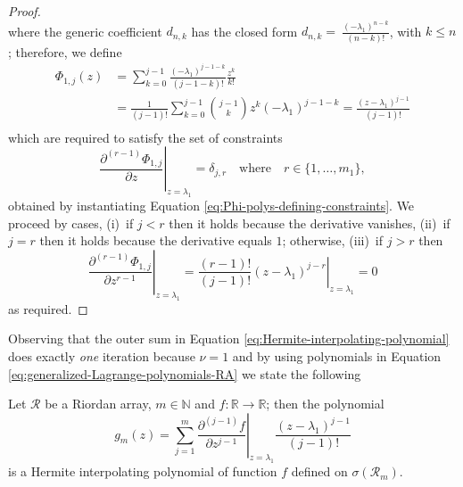 \begin{proof}
\begin{equation}
\end{equation}
where the generic coefficient $d_{n,k}$ has the closed form $\displaystyle
d_{n,k} =~\frac{\left(-\lambda_{1}\right)^{n-k}}{\left(n-k\right)!}$, with
$k\leq n$; therefore, we define
\begin{displaymath}
\begin{split}
  \Phi_{1,j}(z) &= \sum_{k=0}^{j-1}{\frac{(-\lambda_{1})^{j-1-k}}{(j-1-k)!}\frac{z^{k}}{k!}}\\
                &= \frac{1}{(j-1)!}\sum_{k=0}^{j-1}{{ {j-1}\choose{k} }{z^{k}}{(-\lambda_{1})^{j-1-k}}}
                 = \frac{\left(z-\lambda_{1}\right)^{j-1}}{(j-1)!}\\
\end{split}
\end{displaymath}
which are required to satisfy the set of constraints 
\begin{displaymath}
 \left.  \frac{\partial^{(r-1)}{\Phi_{1,j}}}{\partial{z}} \right|_{z=\lambda_{1}} =
\delta_{j,r}\quad\text{where}\quad r \in \lbrace 1, \ldots, m_{1} \rbrace , 
\end{displaymath}
obtained by instantiating Equation \ref{eq:Phi-polys-defining-constraints}.  We
proceed by cases, (i)~if $j<r$ then it holds because the derivative vanishes,
(ii)~if $j=r$ then it holds because the derivative equals $1$; otherwise,
(iii)~if $j>r$ then
\begin{displaymath}
    \left. \frac{\partial^{(r-1)}{\Phi_{1,j}}}{\partial{z}^{r-1}}
    \right|_{z=\lambda_{1}} = 
    \left. \frac{(r-1)!}{(j-1)!}(z-\lambda_{1})^{j-r}
    \right|_{z=\lambda_{1}} = 0
\end{displaymath}
as required.
\qedhere
\end{proof}

Observing that the outer sum in Equation
\ref{eq:Hermite-interpolating-polynomial} does exactly \textit{one} iteration
because $\nu=1$ and by using polynomials in
Equation \ref{eq:generalized-Lagrange-polynomials-RA} %
we state the following
\begin{theorem}
\label{thm:Hermite-interpolating-polynomial-Riordan}
Let $\mathcal{R}$ be a Riordan array, $m\in\mathbb{N}$ and $f:
\mathbb{R}\rightarrow\mathbb{R}$; then the polynomial
\begin{equation}
\label{eq:Hermite-interpolating-polynomial-RA}
g_{m}(z) = {\sum_{j=1}^{m}{ \left.
\frac{\partial^{(j-1)}{f}}{\partial{z}^{j-1}} \right|_{z=\lambda_{1}}}}
\frac{\left(z-\lambda_{1}\right)^{j-1}}{(j-1)!}
\end{equation}
is a Hermite interpolating polynomial of function $f$ defined on
$\sigma\left(\mathcal{R}_{m}\right)$.
\end{theorem}


